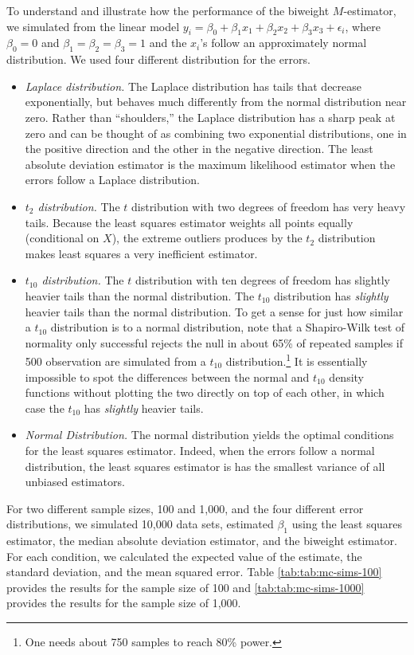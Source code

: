\documentclass[12pt]{article}
\begin{document}
To understand and illustrate how the performance of the biweight $M$-estimator, we simulated from the linear model $y_i = \beta_0 + \beta_1x_1 + \beta_2 x_2 + \beta_3 x_3 + \epsilon_i$, where $\beta_0 = 0$ and $\beta_1 = \beta_2 = \beta_3 = 1$ and the $x_i$'s follow an approximately normal distribution. We used four different distribution for the errors.
\begin{itemize}
\item \textit{Laplace distribution.} The Laplace distribution has tails that decrease exponentially, but behaves much differently from the normal distribution near zero. Rather than ``shoulders,'' the Laplace distribution has a sharp peak at zero and can be thought of as combining two exponential distributions, one in the positive direction and the other in the negative direction. The least absolute deviation estimator is the maximum likelihood estimator when the errors follow a Laplace distribution.
\item \textit{$t_2$ distribution.} The $t$ distribution with two degrees of freedom has very heavy tails. Because the least squares estimator weights all points equally (conditional on $X$), the extreme outliers produces by the $t_2$ distribution makes least squares a very inefficient estimator.
\item \textit{$t_{10}$ distribution.} The $t$ distribution with ten degrees of freedom has slightly heavier tails than the normal distribution. The $t_10$ distribution has \textit{slightly} heavier tails than the normal distribution. To get a sense for just how similar a $t_{10}$ distribution is to a normal distribution, note that a Shapiro-Wilk test of normality only successful rejects the null in about 65\% of repeated samples if 500 observation are simulated from a $t_{10}$ distribution.\footnote{One needs about 750 samples to reach 80\% power.} It is essentially impossible to spot the differences between the normal and $t_{10}$ density functions without plotting the two directly on top of each other, in which case the $t_{10}$ has \textit{slightly} heavier tails.
\item \textit{Normal Distribution.} The normal distribution yields the optimal conditions for the least squares estimator. Indeed, when the errors follow a normal distribution, the least squares estimator is has the smallest variance of all unbiased estimators. 
\end{itemize}

For two different sample sizes, 100 and 1,000, and the four different error distributions, we simulated 10,000 data sets, estimated $\beta_1$ using the least squares estimator, the median absolute deviation estimator, and the biweight estimator. For each condition, we calculated the expected value of the estimate, the standard deviation, and the mean squared error. Table \ref{tab:tab:mc-sims-100} provides the results for the sample size of 100 and \ref{tab:tab:mc-sims-1000} provides the results for the sample size of 1,000. 
\end{document}
